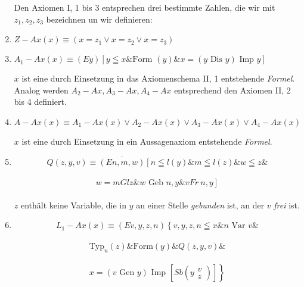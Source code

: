 \documentclass[draft]{scrartcl}
\begin{document}
\begin{enumerate}[1.]
	Den Axiomen I, 1 bis 3 entsprechen drei bestimmte Zahlen, die wir mit $z_1, z_2, z_3$ bezeichnen un wir definieren:

	\item {}$Z - Ax\left(x\right) \equiv \left(x = z_1 \lor x = z_2 \lor x = z_3\right)$

	\item $A_1 - Ax\left(x\right) \equiv \left(Ey\right) \left[y \leqq x\& \text{Form }\left(y\right) \& x = \left(y \text{ Dis } y\right) \text{ Imp } y\right]$%

	$x$ ist eine durch Einsetzung in das Axiomenschema II, 1 entstehende \textit{Formel}. Analog werden $A_2 - Ax, A_3 - Ax, A_4 - Ax$ entsprechend den Axiomen II, 2 bis 4 definiert.

	\item $A - Ax \left(x\right) \equiv A_1 - Ax\left(x\right) \lor A_2 - Ax\left(x\right) \lor A_3 - Ax\left(x\right) \lor A_4 - Ax\left(x\right)$

	$x$ ist eine durch Einsetzung in ein Aussagenaxiom entstehende \textit{Formel}.

	\item $$Q\left(z, y, v\right) \equiv \overline{\left(En, m, w\right)} \left[n \leqq l\left(y\right) \& m \leqq l\left(z\right) \& w \leqq z\right. \&
	$$\\[\spacebetweenbreakedequations]
	$$ \left.w = m Gl z \& w \text{ Geb } n, y \& v Fr\ n, y\right]$$\\[\spaceafterbreakedequation]
	
	$z$ enthält keine Variable, die in $y$ an einer Stelle
	\textit{gebunden} ist, an der $v$ \textit{frei} ist.

	\item $$
		L_1 - Ax\left(x\right) \equiv \left(Ev, y, z, n\right) \left\{v, y, z, n \leqq x \& n \text{ Var } v \&\right.
	$$\\[\spacebetweenbreakedequations]
	$$ 
		\left.\text{Typ}_n\left(z\right) \& \text{Form}\left(y\right) \& Q\left(z, y, v\right) \&\right.
	$$\\[\spacebetweenbreakedequations]
	$$
		\left.x = \left(v \text{ Gen } y\right) \text{ Imp } \left[Sb \left(y \substack{v\\z}\right)\right]\right\}
	$$\\[\spaceafterbreakedequation]


\end{enumerate}
\end{document}
